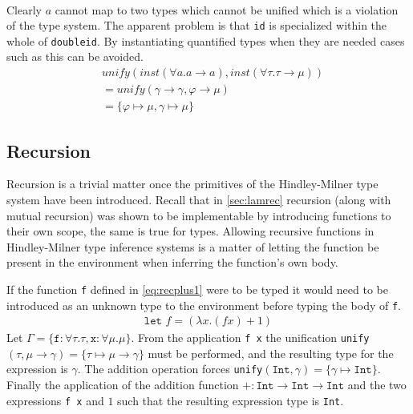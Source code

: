 \documentclass[11pt,oneside,a4paper]{report}
\begin{document}
\begin{exmp}
\begin{align}
\end{align}
    Clearly $a$ cannot map to two types which cannot be unified which is a violation of the type system.
    The apparent problem is that \texttt{id} is specialized within the whole of \texttt{doubleid}.
    By instantiating quantified types when they are needed cases such as this can be avoided.
    \begin{align}
        &\textit{unify}(\textit{inst}(\forall a . a \rightarrow a), \textit{inst}(\forall \tau . \tau \rightarrow \mu))\\
        & = \textit{unify}(\gamma \rightarrow \gamma, \varphi \rightarrow \mu) \tag*{}\\
        & = \{ \varphi \mapsto \mu, \gamma \mapsto \mu \} \tag*{}
    \end{align}
\end{exmp}
\subsection{Recursion}
Recursion is a trivial matter once the primitives of the Hindley-Milner type system have been introduced.
Recall that in \autoref{sec:lamrec} recursion (along with mutual recursion) was shown to be implementable by introducing functions to their own scope, the same is true for types.
Allowing recursive functions in Hindley-Milner type inference systems is a matter of letting the function be present in the environment when inferring the function's own body.
\begin{exmp}
If the function \texttt{f} defined in \autoref{eq:recplus1} were to be typed it would need to be introduced as an unknown type to the environment before typing the body of \texttt{f}.
\begin{align}
  \texttt{let } f = (\lambda x. (f x) + 1) \label{eq:recplus1}
\end{align}
Let $\Gamma = \{ \texttt{f} : \forall \tau . \tau, \texttt{x} : \forall \mu . \mu \}$.
From the application \texttt{f x} the unification \texttt{unify}$(\tau, \mu \rightarrow \gamma) = \{ \tau \mapsto \mu \rightarrow \gamma \}$ must be performed, and the resulting type for the expression is $\gamma$.
The addition operation forces \texttt{unify}$(\texttt{Int}, \gamma) = \{ \gamma \mapsto \texttt{Int} \}$.
Finally the application of the addition function $+: \texttt{Int} \rightarrow \texttt{Int} \rightarrow \texttt{Int}$ and the two expressions \texttt{f x} and $1$ such that the resulting expression type is \texttt{Int}.

\end{exmp}
\end{document}

